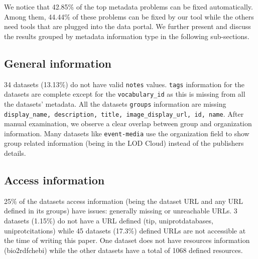 \documentclass[runningheads,a4paper]{llncs}
\begin{document}
We notice that 42.85\% of the top metadata problems can be fixed automatically. Among them, 44.44\% of these problems can be fixed by our tool while the others need tools that are plugged into the data portal. We further present and discuss the results grouped by metadata information type in the following sub-sections.

\subsection{General information}
34 datasets (13.13\%) do not have valid \texttt{notes} values. \texttt{tags} information for the datasets are complete except for the \texttt{vocabulary\_id} as this is missing from all the datasets' metadata. All the datasets \texttt{groups} information are missing \texttt{display\_name, description, title, image\_display\_url, id, name}. After manual examination, we observe a clear overlap between group and organization information. Many datasets like \texttt{event-media} use the organization field to show group related information (being in the LOD Cloud) instead of the publishers details.

\subsection{Access information}
25\% of the datasets access information (being the dataset URL and any URL defined in its groups) have issues: generally missing or unreachable URLs. 3 datasets (1.15\%) do not have a URL defined (tip, uniprot\-databases, uniprot\-citations) while 45 datasets (17.3\%) defined URLs are not accessible at the time of writing this paper. One dataset does not have resources information (bio2rdf\-chebi) while the other datasets have a total of 1068 defined resources.
\end{document}
